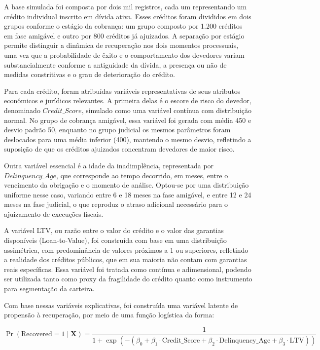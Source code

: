 \documentclass[a4paper,12pt]{article}
\begin{document}
A base simulada foi composta por dois mil registros, cada um representando um crédito individual inscrito em dívida ativa. Esses créditos foram divididos em dois grupos conforme o estágio da cobrança: um grupo composto por 1.200 créditos em fase amigável e outro por 800 créditos já ajuizados. A separação por estágio permite distinguir a dinâmica de recuperação nos dois momentos processuais, uma vez que a probabilidade de êxito e o comportamento dos devedores variam substancialmente conforme a antiguidade da dívida, a presença ou não de medidas constritivas e o grau de deterioração do crédito.

Para cada crédito, foram atribuídas variáveis representativas de seus atributos econômicos e jurídicos relevantes. A primeira delas é o escore de risco do devedor, denominado $Credit\_Score$, simulado como uma variável contínua com distribuição normal. No grupo de cobrança amigável, essa variável foi gerada com média 450 e desvio padrão 50, enquanto no grupo judicial os mesmos parâmetros foram deslocados para uma média inferior (400), mantendo o mesmo desvio, refletindo a suposição de que os créditos ajuizados concentram devedores de maior risco.

Outra variável essencial é a idade da inadimplência, representada por $Delinquency\_Age$, que corresponde ao tempo decorrido, em meses, entre o vencimento da obrigação e o momento de análise. Optou-se por uma distribuição uniforme nesse caso, variando entre 6 e 18 meses na fase amigável, e entre 12 e 24 meses na fase judicial, o que reproduz o atraso adicional necessário para o ajuizamento de execuções fiscais.

A variável LTV, ou razão entre o valor do crédito e o valor das garantias disponíveis (Loan-to-Value), foi construída com base em uma distribuição assimétrica, com predominância de valores próximos a 1 ou superiores, refletindo a realidade dos créditos públicos, que em sua maioria não contam com garantias reais específicas. Essa variável foi tratada como contínua e adimensional, podendo ser utilizada tanto como proxy da fragilidade do crédito quanto como instrumento para segmentação da carteira.

Com base nessas variáveis explicativas, foi construída uma variável latente de propensão à recuperação, por meio de uma função logística da forma:

\[
\Pr(\text{Recovered} = 1 \mid \mathbf{X}) = \frac{1}{1 + \exp\left(-(\beta_0 + \beta_1 \cdot \text{Credit\_Score} + \beta_2 \cdot \text{Delinquency\_Age} + \beta_3 \cdot \text{LTV})\right)}
\]
 
\end{document}
